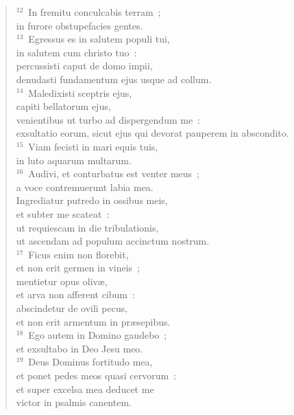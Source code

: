 \begin{verse}
${}^{12}$~In fremitu conculcabis terram~;\\ in furore obstupefacies gentes.\\
${}^{13}$~Egressus es in salutem populi tui,\\ in salutem cum christo tuo~:\\ percussisti caput de domo impii,\\ denudasti fundamentum ejus usque ad collum.\\
${}^{14}$~Maledixisti sceptris ejus,\\ capiti bellatorum ejus,\\ venientibus ut turbo ad dispergendum me~:\\ exsultatio eorum, sicut ejus qui devorat pauperem in abscondito.\\
${}^{15}$~Viam fecisti in mari equis tuis,\\ in luto aquarum multarum.\\
${}^{16}$~Audivi, et conturbatus est venter meus~;\\ a voce contremuerunt labia mea.\\ Ingrediatur putredo in ossibus meis,\\ et subter me scateat~:\\ ut requiescam in die tribulationis,\\ ut ascendam ad populum accinctum nostrum.\\
${}^{17}$~Ficus enim non florebit,\\ et non erit germen in vineis~;\\ mentietur opus oliv\ae ,\\ et arva non afferent cibum~:\\ abscindetur de ovili pecus,\\ et non erit armentum in pr\ae sepibus.\\
${}^{18}$~Ego autem in Domino gaudebo~;\\ et exsultabo in Deo Jesu meo.\\
${}^{19}$~Deus Dominus fortitudo mea,\\ et ponet pedes meos quasi cervorum~:\\ et super excelsa mea deducet me\\ victor in psalmis canentem.\end{verse}



